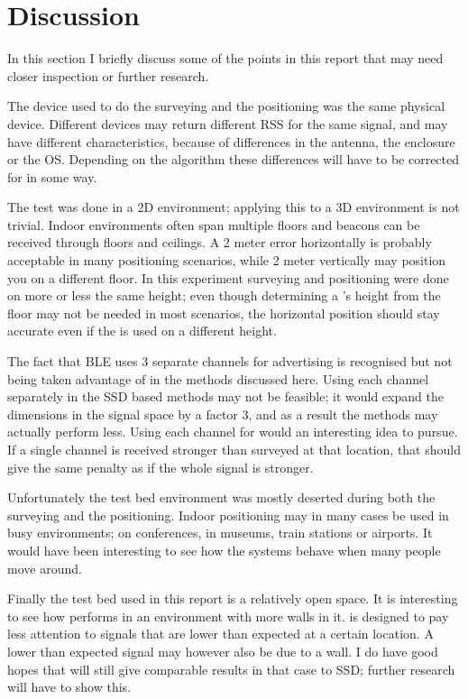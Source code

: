\section{Discussion}
In this section I briefly discuss some of the points in this report that may need closer inspection or further research.

The device used to do the surveying and the positioning was the same physical device.
Different devices may return different RSS for the same signal, and may have different characteristics, because of differences in the antenna, the enclosure or the OS.
Depending on the algorithm these differences will have to be corrected for in some way.

The test was done in a 2D environment; applying this to a 3D environment is not trivial.
Indoor environments often span multiple floors and beacons can be received through floors and ceilings.
A 2 meter error horizontally is probably acceptable in many positioning scenarios, while 2 meter vertically may position you on a different floor.
In this experiment surveying and positioning were done on more or less the same height; even though determining a \device's height from the floor may not be needed in most scenarios, the horizontal position should stay accurate even if the \device is used on a different height.

The fact that BLE uses 3 separate channels for advertising is recognised but not being taken advantage of in the methods discussed here.
Using each channel separately in the SSD based methods may not be feasible; it would expand the dimensions in the signal space by a factor 3, and as a result the methods may actually perform less.
Using each channel for \aBRP would an interesting idea to pursue.
If a single channel is received stronger than surveyed at that location, that should give the same penalty as if the whole signal is stronger.

Unfortunately the test bed environment was mostly deserted during both the surveying and the positioning.
Indoor positioning may in many cases be used in busy environments; on conferences, in museums, train stations or airports.
It would have been interesting to see how the systems behave when many people move around.

Finally the test bed used in this report is a relatively open space.
It is interesting to see how \aBRP performs in an environment with more walls in it.
\aBRP is designed to pay less attention to signals that are lower than expected at a certain location.
A lower than expected signal may however also be due to a wall.
I do have good hopes that \aBRP will still give comparable results in that case to SSD; further research will have to show this.

